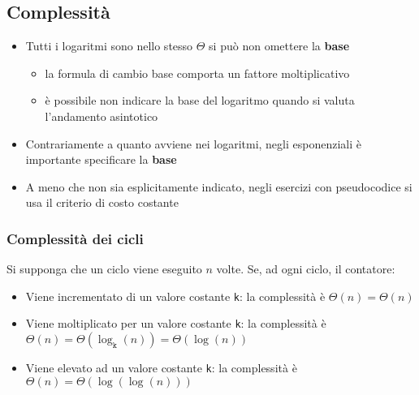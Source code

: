 \documentclass[italian, 10pt]{article}
\begin{document}
\subsection{Complessità}

\begin{itemize}
  \item Tutti i logaritmi sono nello stesso \(\Theta\) si può non omettere la \textbf{base}
        \begin{itemize}
          \item la formula di cambio base comporta un fattore moltiplicativo
          \item è possibile non indicare la base del logaritmo quando si valuta l'andamento asintotico
        \end{itemize}
  \item Contrariamente a quanto avviene nei logaritmi, negli esponenziali è importante specificare la \textbf{base}
  \item A meno che non sia esplicitamente indicato, negli esercizi con pseudocodice si usa il criterio di costo costante
\end{itemize}

\subsubsection{Complessità dei cicli}

Si supponga che un ciclo viene eseguito \(n\) volte.
Se, ad ogni ciclo, il contatore:

\begin{itemize}
  \item Viene incrementato di un valore costante \texttt{k}: la complessità è \(\Theta(n) = \Theta(n)\)
  \item Viene moltiplicato per un valore costante \texttt{k}: la complessità è \(\Theta(n) = \Theta\left(\log_\texttt{k}{(n)}\right) = \Theta\left(\log{(n)}\right)\)
  \item Viene elevato ad un valore costante \texttt{k}: la complessità è \(\Theta(n) = \Theta\left(\log{\left(\log{(n)}\right)}\right)\)
\end{itemize}
\end{document}
